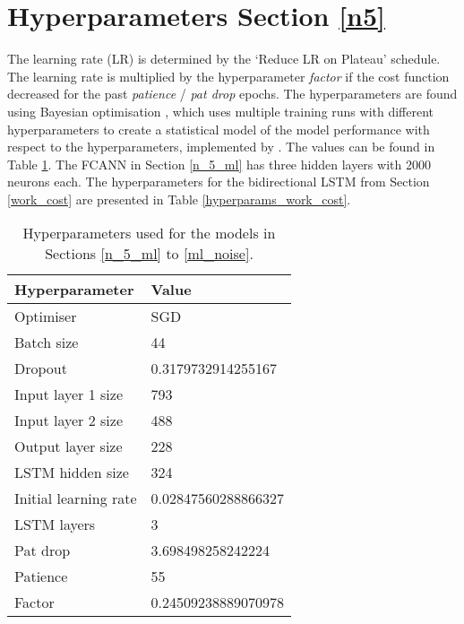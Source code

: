 \section{Hyperparameters Section \ref{n5}}
The learning rate (LR) is determined by the `Reduce LR on Plateau' schedule.
The learning rate is multiplied by the hyperparameter \textit{factor} if the cost function decreased for the past \textit{patience} / \textit{pat drop} epochs.
The hyperparameters are found using Bayesian optimisation \cite{frazier2018tutorial}, which uses multiple training runs with different hyperparameters to create a statistical model of the model performance with respect to the hyperparameters, implemented by \cite{wandb}.
The values can be found in Table \ref{hyperparams_n_5}.
The FCANN in Section \ref{n_5_ml} has three hidden layers with 2000 neurons each.
The hyperparameters for the bidirectional LSTM from Section \ref{work_cost} are presented in Table \ref{hyperparams_work_cost}.

\begin{table}[h]
	\centering
	\begin{tabular}{l | l}
		Hyperparameter & Value \\
		\hline
		Optimiser & SGD \\
		Batch size & 44 \\
		Dropout & 0.3179732914255167 \\
		Input layer 1 size & 793 \\
		Input layer 2 size & 488 \\
		Output layer size & 228 \\
		LSTM hidden size & 324 \\
		Initial learning rate & 0.02847560288866327 \\
		LSTM layers & 3 \\
		Pat drop & 3.698498258242224 \\
		Patience & 55 \\
		Factor & 0.24509238889070978
	\end{tabular}
	\caption{Hyperparameters used for the models in Sections \ref{n_5_ml} to \ref{ml_noise}.}
	\label{hyperparams_n_5}
\end{table}

